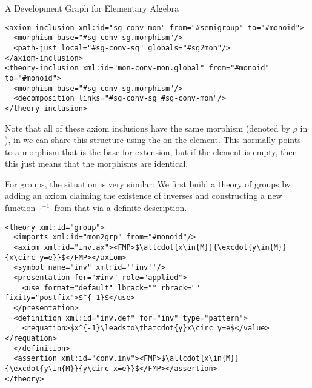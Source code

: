 \begin{tchapter}[id=dg-elal]{A Development Graph for Elementary Algebra}
\begin{lstlisting}[mathescape,index={axiom-inclusion,theory-inclusion,morphism,obligation}]
<axiom-inclusion xml:id="sg-conv-mon" from="#semigroup" to="#monoid">
  <morphism base="#sg-conv-sg.morphism"/>
  <path-just local="#sg-conv-sg" globals="#sg2mon"/>
</axiom-inclusion>
<theory-inclusion xml:id="mon-conv-mon.global" from="#monoid" to="#monoid">
  <morphism base="#sg-conv-sg.morphism"/>
  <decomposition links="#sg-conv-sg #sg-conv-mon"/>
</theory-inclusion>
\end{lstlisting}
Note that all of these axiom inclusions have the same morphism (denoted by $\rho$
in {}), in {\omdoc} we can share this structure using the
{} on the {} element. This normally
points to a morphism that is the base for extension, but if the
{} element is empty, then this just means that the morphisms are
identical. 

For groups, the situation is very similar: We first build a theory of groups by
adding an axiom claiming the existence of inverses and constructing a new function
$\cdot^{-1}$ from that via a definite description. 

\begin{lstlisting}[mathescape]
<theory xml:id="group">
  <imports xml:id="mon2grp" from="#monoid"/>
  <axiom xml:id="inv.ax"><FMP>$\allcdot{x\in{M}}{\excdot{y\in{M}}{x\circ y=e}}$</FMP></axiom>
  <symbol name="inv" xml:id=''inv''/>
  <presentation for="#inv" role="applied">
    <use format="default" lbrack="" rbrack="" fixity="postfix">$^{-1}$</use>
  </presentation>
  <definition xml:id="inv.def" for="inv" type="pattern">
    <requation>$x^{-1}\leadsto\thatcdot{y}x\circ y=e$</value></requation>
  </definition>
  <assertion xml:id="conv.inv"><FMP>$\allcdot{x\in{M}}{\excdot{y\in{M}}{y\circ x=e}}$</FMP></assertion>
</theory>
\end{lstlisting}


\end{tchapter}
